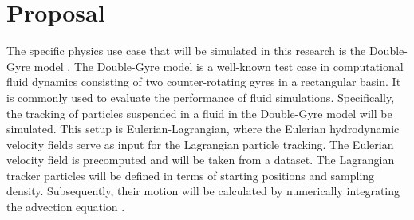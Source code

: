 \section{Proposal} \label{section: proposal}




The specific physics use case that will be simulated in this research is the Double-Gyre model \cite{double-gyre}.
The Double-Gyre model is a well-known test case in computational fluid dynamics consisting of two counter-rotating gyres in a rectangular basin. It is commonly used to evaluate the performance of fluid simulations.
Specifically, the tracking of particles suspended in a fluid in the Double-Gyre model will be simulated. This setup is Eulerian-Lagrangian, where the Eulerian hydrodynamic velocity fields serve as input for the Lagrangian particle tracking.
The Eulerian velocity field is precomputed and will be taken from a dataset. The Lagrangian tracker particles will be defined in terms of starting positions and sampling density. Subsequently, their motion will be calculated by numerically integrating the advection equation \cite{advEq}.
\paraend


\newpage